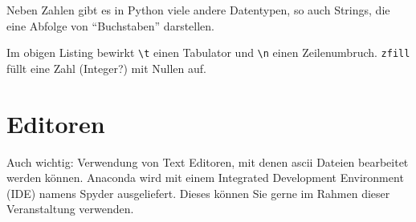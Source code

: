 Neben Zahlen gibt es in Python viele andere Datentypen, so auch Strings, die eine Abfolge von ``Buchstaben'' darstellen. 



Im obigen Listing bewirkt \texttt{\textbackslash t} einen Tabulator und \texttt{\textbackslash n} einen Zeilenumbruch.
\texttt{zfill} füllt eine Zahl (Integer?) mit Nullen auf.

\section{Editoren}

Auch wichtig: Verwendung von Text Editoren, mit denen ascii Dateien bearbeitet werden können. 
%
Anaconda wird mit einem Integrated Development Environment (IDE) namens Spyder ausgeliefert.
Dieses k\"onnen Sie gerne im Rahmen dieser Veranstaltung verwenden.

